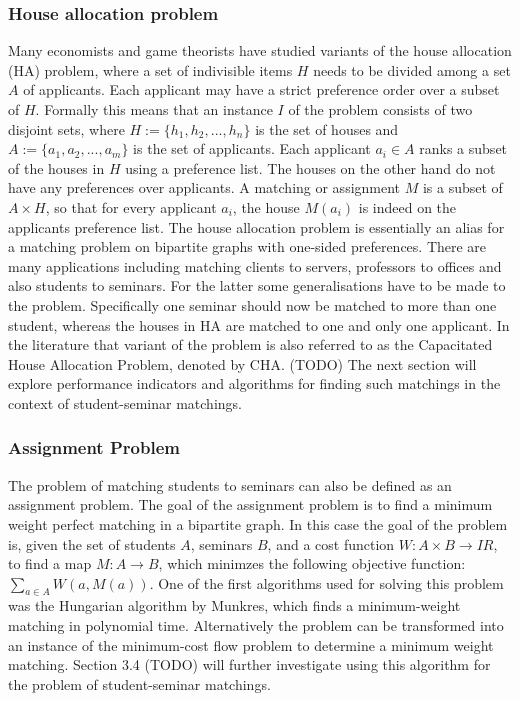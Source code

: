 \subsubsection{House allocation problem}
Many economists and game theorists\cite{FEKETE2003219} have studied variants of the house allocation (HA) problem, where a set of indivisible items $H$ needs to be divided among a set $A$ of applicants. Each applicant may have a strict preference order over a subset of $H$. Formally this means that an instance $I$ of the problem consists of two disjoint sets, where $H := \{h_1, h_2, ..., h_n\}$ is the set of houses and $A := \{a_1, a_2, ..., a_m\}$ is the set of applicants. Each applicant $a_i \in A$ ranks a subset of the houses in $H$ using a preference list. The houses on the other hand do not have any preferences over applicants. A matching or assignment $M$ is a subset of $A \times H$, so that for every applicant $a_i$, the house $M(a_i)$ is indeed on the applicants preference list.\cite{SngThesis} 
\newline
The house allocation problem is essentially an alias for a matching problem on bipartite graphs with one-sided preferences. There are many applications including matching clients to servers, professors to offices and also students to seminars. For the latter some generalisations have to be made to the problem. Specifically one seminar should now be matched to more than one student, whereas the houses in HA are matched to one and only one applicant. In the literature that variant of the problem is also referred to as the Capacitated House Allocation Problem, denoted by CHA.\cite{algorithmics} (TODO) The next section will explore performance indicators and algorithms for finding such matchings in the context of student-seminar matchings.

\subsubsection{Assignment Problem}\label{intro_assignment}
The problem of matching students to seminars can also be defined as an assignment problem. The goal of the assignment problem is to find a minimum weight perfect matching in a bipartite graph. In this case the goal of the problem is, given the set of students $A$, seminars $B$, and a cost function $W: A \times B \rightarrow I\!R$, to find a map $M: A \rightarrow B$, which minimzes the following objective function:
$\sum_{a \in A} W(a, M(a))$.
\newline
One of the first algorithms used for solving this problem was the Hungarian algorithm by Munkres, which finds a minimum-weight matching in polynomial time.\cite{Munkres} 
\newline
Alternatively the problem can be transformed into an instance of the minimum-cost flow problem to determine a minimum weight matching. Section 3.4 (TODO) will further investigate using this algorithm for the problem of student-seminar matchings.

